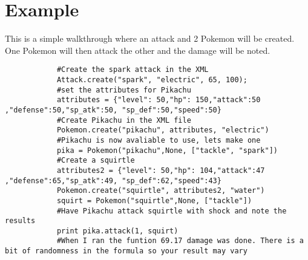 \documentclass{article}
\begin{document}
        \section{Example}
        This is a simple walkthrough where an attack and 2 Pokemon will be created. One Pokemon will then attack the other and the damage will be noted.
        \begin{lstlisting}
            #Create the spark attack in the XML
            Attack.create("spark", "electric", 65, 100);
            #set the attributes for Pikachu
            attributes = {"level": 50,"hp": 150,"attack":50 ,"defense":50,"sp_atk":50, "sp_def":50,"speed":50}
            #Create Pikachu in the XML file
            Pokemon.create("pikachu", attributes, "electric")
            #Pikachu is now avaliable to use, lets make one
            pika = Pokemon("pikachu",None, ["tackle", "spark"])
            #Create a squirtle
            attributes2 = {"level": 50,"hp": 104,"attack":47 ,"defense":65,"sp_atk":49, "sp_def":62,"speed":43}
            Pokemon.create("squirtle", attributes2, "water")
            squirt = Pokemon("squirtle",None, ["tackle"])
            #Have Pikachu attack squirtle with shock and note the results
            print pika.attack(1, squirt)
            #When I ran the funtion 69.17 damage was done. There is a bit of randomness in the formula so your result may vary
        \end{lstlisting}
        
\end{document}
